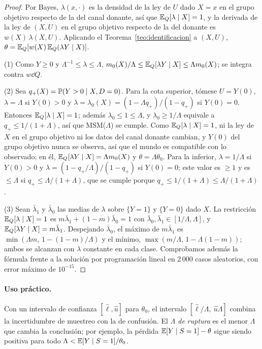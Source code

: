 \begin{proof}
Por Bayes, $\lambda(x,\cdot)$ es la densidad de la ley de $U$ dado $X=x$ en el grupo objetivo respecto de la del canal donante, así que $\mathbb{E}_Q[\lambda\mid X]=1$, y la derivada de la ley de $(X,U)$ en el grupo objetivo respecto de la del donante es $w(X)\,\lambda(X,U)$. Aplicando el Teorema~\ref{teo:identificacion} a $(X,U)$, $\theta=\mathbb{E}_Q[w(X)\,\mathbb{E}_Q(\lambda Y\mid X)]$.

(1) Como $Y\ge0$ y $\Lambda^{-1}\le\lambda\le\Lambda$, $m_0(X)/\Lambda\le\mathbb{E}_Q[\lambda Y\mid X]\le\Lambda m_0(X)$; se integra contra $w\dd Q$.

(2) Sea $q_+(X)=\mathbb{P}(Y>0\mid X,D=0)$. Para la cota superior, tómese $U=Y(0)$, $\lambda=\Lambda$ si $Y(0)>0$ y $\lambda=\lambda_0(X)=(1-\Lambda q_+)/(1-q_+)$ si $Y(0)=0$. Entonces $\mathbb{E}_Q[\lambda\mid X]=1$; además $\lambda_0\le1\le\Lambda$, y $\lambda_0\ge1/\Lambda$ equivale a $q_+\le1/(1+\Lambda)$, así que MSM($\Lambda$) se cumple. Como $\mathbb{E}_Q[\lambda\mid X]=1$, ni la ley de $X$ en el grupo objetivo ni los datos del canal donante cambian, y $Y(0)$ del grupo objetivo nunca se observa, así que el mundo es compatible con lo observado; en él, $\mathbb{E}_Q[\lambda Y\mid X]=\Lambda m_0(X)$ y $\theta=\Lambda\theta_0$. Para la inferior, $\lambda=1/\Lambda$ si $Y(0)>0$ y $\lambda=(1-q_+/\Lambda)/(1-q_+)$ si $Y(0)=0$; este valor es $\ge1$ y es $\le\Lambda$ si $q_+\le\Lambda/(1+\Lambda)$, que se cumple porque $q_+\le1/(1+\Lambda)\le\Lambda/(1+\Lambda)$.

(3) Sean $\bar\lambda_1$ y $\bar\lambda_0$ las medias de $\lambda$ sobre $\{Y=1\}$ y $\{Y=0\}$ dado $X$. La restricción $\mathbb{E}_Q[\lambda\mid X]=1$ es $m\bar\lambda_1+(1-m)\bar\lambda_0=1$ con $\bar\lambda_0,\bar\lambda_1\in[1/\Lambda,\Lambda]$, y $\mathbb{E}_Q[\lambda Y\mid X]=m\bar\lambda_1$. Despejando $\bar\lambda_0$, el máximo de $m\bar\lambda_1$ es $\min(\Lambda m,\,1-(1-m)/\Lambda)$ y el mínimo, $\max(m/\Lambda,\,1-\Lambda(1-m))$; ambos se alcanzan con $\lambda$ constante en cada clase. Comprobamos además la fórmula frente a la solución por programación lineal en 2\,000 casos aleatorios, con error máximo de $10^{-15}$.
\end{proof}

\paragraph{Uso práctico.} Con un intervalo de confianza $[\hat\ell,\hat u]$ para $\theta_0$, el intervalo $[\hat\ell/\Lambda,\ \hat u\Lambda]$ combina la incertidumbre de muestreo con la de confusión. El \emph{$\Lambda$ de ruptura} es el menor $\Lambda$ que cambia la conclusión; por ejemplo, la pérdida $\mathbb{E}[Y\mid S=1]-\theta$ sigue siendo positiva para todo $\Lambda<\mathbb{E}[Y\mid S=1]/\theta_0$.

